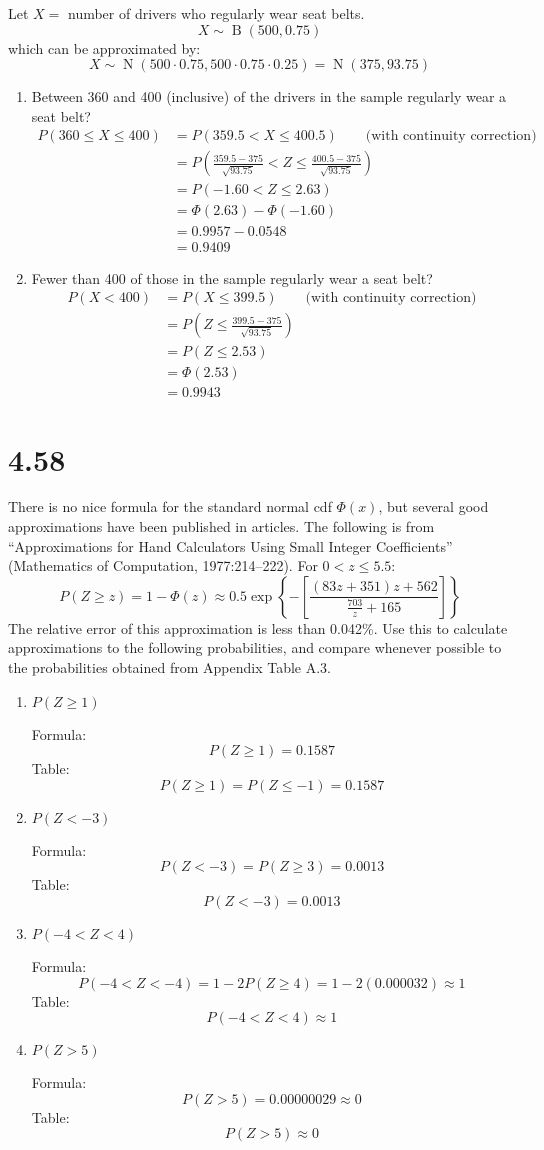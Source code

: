 \documentclass[letterpaper,12pt,fleqn]{article}
\renewcommand{\O}{\Phi}
\DeclareMathOperator{\nord}{N}
\DeclareMathOperator{\bind}{B}
\begin{document}
Let \(X=\) number of drivers who regularly wear seat belts.
\[X\sim\bind(500,0.75)\]
which can be approximated by:
\[X\sim\nord(500\cdot0.75,500\cdot0.75\cdot0.25)=\nord(375,93.75)\]
\begin{enumerate}[label={\alph*)}]
\item Between 360 and 400 (inclusive) of the drivers in the sample regularly wear a seat belt?
  \begin{align*}
    P(360\le X\le 400) &= P(359.5<X\le400.5)\qquad\text{(with continuity correction)} \\
    &= P\left(\frac{359.5-375}{\sqrt{93.75}}<Z\le\frac{400.5-375}{\sqrt{93.75}}\right) \\
    &= P(-1.60<Z\le2.63) \\
    &= \O(2.63)-\O(-1.60) \\
    &= 0.9957-0.0548 \\
    &= 0.9409
  \end{align*}
\item Fewer than 400 of those in the sample regularly wear a seat belt?
  \begin{align*}
    P(X<400) &= P(X\le399.5)\qquad\text{(with continuity correction)} \\
    &= P\left(Z\le\frac{399.5-375}{\sqrt{93.75}}\right) \\
    &= P(Z\le2.53) \\
    &= \O(2.53) \\
    &= 0.9943
  \end{align*}
\end{enumerate}

\section*{4.58}

There is no nice formula for the standard normal cdf \(\O(x)\), but several good approximations have been published in
articles.  The following is from ``Approximations for Hand Calculators Using Small Integer Coefficients'' (Mathematics
of Computation, 1977:214--222).  For \(0<z\le5.5\):
\[P(Z\ge z)=1-\O(z)\approx0.5\exp\left\{-\left[\frac{(83z+351)z+562}{\frac{703}{z}+165}\right]\right\}\]
The relative error of this approximation is less than 0.042\%.  Use this to calculate approximations to the following
probabilities, and compare whenever possible to the probabilities obtained from Appendix Table A.3.
\begin{enumerate}[label={\alph*)}]
\item \(P(Z\ge1)\)
  
  Formula:
  \[P(Z\ge1)=0.1587\]
  Table:
  \[P(Z\ge1)=P(Z\le-1)=0.1587\]
\item \(P(Z<-3)\)
  
  Formula:
  \[P(Z<-3)=P(Z\ge3)=0.0013\]
  Table:
  \[P(Z<-3)=0.0013\]
\item \(P(-4<Z<4)\)

  Formula:
  \[P(-4<Z<-4)=1-2P(Z\ge4)=1-2(0.000032)\approx1\]
  Table:
  \[P(-4<Z<4)\approx1\]
\item \(P(Z>5)\)

  Formula:
  \[P(Z>5)=0.00000029\approx0\]
  Table:
  \[P(Z>5)\approx0\]
\end{enumerate}
\end{document}
